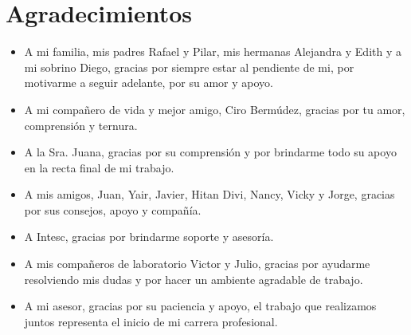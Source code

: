 \chapter{Agradecimientos}

\begin{itemize}
\item A mi familia, mis padres Rafael y Pilar, mis hermanas Alejandra y Edith y a mi sobrino Diego, gracias por siempre estar al pendiente de mi, por motivarme a seguir adelante, por su amor y apoyo.
\item A mi compañero de vida y mejor amigo, Ciro Bermúdez, gracias por tu amor, comprensión y ternura.
\item A la Sra. Juana, gracias por su comprensión y por brindarme todo su apoyo en la recta final de mi trabajo.
\item A mis amigos, Juan, Yair, Javier, Hitan Divi, Nancy, Vicky y Jorge, gracias por sus consejos, apoyo y compañía.
\item A Intesc, gracias por brindarme soporte y asesoría.
\item A mis compañeros de laboratorio Victor y Julio, gracias por ayudarme resolviendo mis dudas y por hacer un ambiente agradable de trabajo.
\item A mi asesor, gracias por su paciencia y apoyo, el trabajo que realizamos juntos representa el inicio de mi carrera profesional.
\end{itemize}


